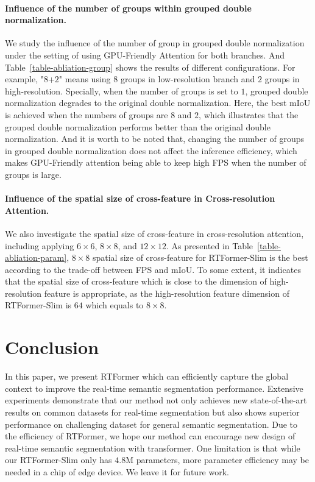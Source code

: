 \documentclass{article}
\begin{document}
\paragraph{Influence of the number of groups within grouped double normalization.} 
We study the influence of the number of group in grouped double normalization under the setting of using GPU-Friendly Attention for both branches. And Table~\ref{table-abliation-group} shows the results of different configurations. For example, "$8$+$2$" means using $8$ groups in low-resolution branch and $2$ groups in high-resolution. Specially, when the number of groups is set to $1$, grouped double normalization degrades to the original double normalization. Here, the best mIoU is achieved when the numbers of groups are $8$ and $2$, which illustrates that the grouped double normalization performs better than the original double normalization. And it is worth to be noted that, changing the number of groups in grouped double normalization does not affect the inference efficiency, which makes GPU-Friendly attention being able to keep high FPS when the number of groups is large.

\vspace{-2mm}
\paragraph{Influence of the spatial size of cross-feature in Cross-resolution Attention.}
We also investigate the spatial size of cross-feature in cross-resolution attention, including applying $6\times6$, $8\times8$, and $12\times12$. As presented in Table~\ref{table-abliation-param}, $8\times8$ spatial size of cross-feature for RTFormer-Slim is the best according to the trade-off between FPS and mIoU. To some extent, it indicates that the spatial size of cross-feature which is close to the dimension of high-resolution feature is appropriate, as the high-resolution feature dimension of RTFormer-Slim is $64$ which equals to $8\times8$.

\section{Conclusion}
In this paper, we present RTFormer which can  efficiently capture the global context to improve the real-time semantic segmentation performance. Extensive experiments demonstrate that our method not only achieves new state-of-the-art results on common datasets for real-time segmentation but also shows superior performance on challenging dataset for general semantic segmentation. Due to the efficiency of RTFormer, we hope our method can encourage new design of real-time semantic segmentation with transformer. One limitation is that while our RTFormer-Slim only has $4.8$M parameters, more parameter efficiency may be needed in a chip of edge device. We leave it for future work.
\end{document}
